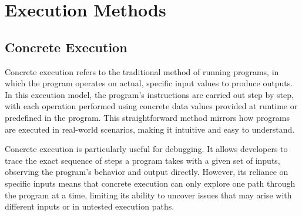 \section{Execution Methods}
\subsection{Concrete Execution}
Concrete execution refers to the traditional method of running programs, in which the program operates on actual, specific input values to produce outputs.
In this execution model, the program's instructions are carried out step by step, with each operation performed using concrete data values provided at runtime or predefined in the program. 
This straightforward method mirrors how programs are executed in real-world scenarios, making it intuitive and easy to understand. 

Concrete execution is particularly useful for debugging.
It allows developers to trace the exact sequence of steps a program takes with a given set of inputs, observing the program's behavior and output directly.
However, its reliance on specific inputs means that concrete execution can only explore one path through the program at a time, limiting its ability to uncover issues that may arise with different inputs or in untested execution paths.

